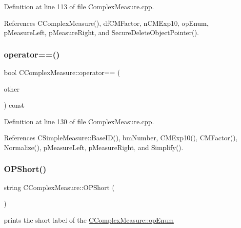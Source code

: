Definition at line 113 of file Complex\+Measure.\+cpp.



References C\+Complex\+Measure(), df\+C\+M\+Factor, n\+C\+M\+Exp10, op\+Enum, p\+Measure\+Left, p\+Measure\+Right, and Secure\+Delete\+Object\+Pointer().

\mbox{\label{classCComplexMeasure_a30c168c8fbc0587835a11914f8af69e9}} 
\subsubsection{\texorpdfstring{operator==()}{operator==()}}
{\footnotesize\ttfamily bool C\+Complex\+Measure\+::operator== (\begin{DoxyParamCaption}\item[{const \hyperlink{classCComplexMeasure}{C\+Complex\+Measure} \&}]{other }\end{DoxyParamCaption}) const}



Definition at line 130 of file Complex\+Measure.\+cpp.



References C\+Simple\+Measure\+::\+Base\+I\+D(), bm\+Number, C\+M\+Exp10(), C\+M\+Factor(), Normalize(), p\+Measure\+Left, p\+Measure\+Right, and Simplify().

\mbox{\label{classCComplexMeasure_ab6a38e7259d7c27e735ff12fd711c5d5}} 
\subsubsection{\texorpdfstring{O\+P\+Short()}{OPShort()}}
{\footnotesize\ttfamily string C\+Complex\+Measure\+::\+O\+P\+Short (\begin{DoxyParamCaption}{ }\end{DoxyParamCaption})\hspace{0.3cm}{\ttfamily [inline]}}



prints the short label of the \hyperlink{classCComplexMeasure_ae22369976a7e5570add11a4172dcf062}{C\+Complex\+Measure\+::op\+Enum} 

